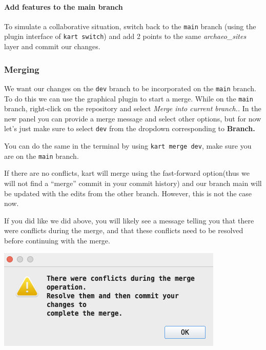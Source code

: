 \documentclass[
  letterpaper,
  DIV=11,
  numbers=noendperiod]{scrartcl}
\let\oldparagraph\paragraph
\renewcommand{\paragraph}[1]{\oldparagraph{#1}\mbox{}}
\begin{document}
\paragraph{Add features to the main
branch}\label{add-features-to-the-main-branch}

To simulate a collaborative situation, switch back to the \texttt{main}
branch (using the plugin interface of \texttt{kart\ switch}) and add 2
points to the same \emph{archaeo\_sites} layer and commit our changes.

\subsubsection{Merging}\label{sec-merging}

We want our changes on the \texttt{dev} branch to be incorporated on the
\texttt{main} branch. To do this we can use the graphical plugin to
start a merge. While on the \texttt{main} branch, right-click on the
repository and select \emph{Merge into current branch..} In the new
panel you can provide a merge message and select other options, but for
now let's just make sure to select \texttt{dev} from the dropdown
corresponding to \textbf{Branch.}

You can do the same in the terminal by using \texttt{kart\ merge\ dev},
make sure you are on the \texttt{main} branch.

If there are no conflicts, kart will merge using the fast-forward
option(thus we will not find a ``merge'' commit in your commit history)
and our branch main will be updated with the edits from the other
branch. However, this is not the case now.

If you did like we did above, you will likely see a message telling you
that there were conflicts during the merge, and that these conflicts
need to be resolved before continuing with the merge.

\begin{center}
\includegraphics{img/kart-panel-conflicts.png}
\end{center}
\end{document}
